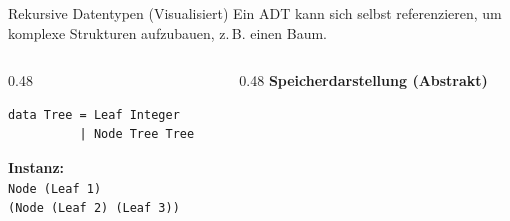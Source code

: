 \documentclass[aspectratio=169,11pt]{beamer}
\begin{document}
\begin{frame}[fragile]{Rekursive Datentypen (Visualisiert)}
    Ein ADT kann sich selbst referenzieren, um komplexe Strukturen aufzubauen, z.\,B. einen Baum.
    
    \begin{columns}[T]
        \begin{column}{0.48\textwidth}
            \begin{tcolorbox}[modernbox, title=Beispiel: Baum (Tree)]
\begin{lstlisting}
data Tree = Leaf Integer 
          | Node Tree Tree
\end{lstlisting}
            \end{tcolorbox}
            \small
            \textbf{Instanz:} \\
            \texttt{Node (Leaf 1) \\ \quad(Node (Leaf 2) (Leaf 3))}
        \end{column}
        \begin{column}{0.48\textwidth}
            \textbf{Speicherdarstellung (Abstrakt)}
            \vspace{0.3cm}
            \begin{center}
            \end{center}
        \end{column}
    \end{columns}
\end{frame}
\end{document}
